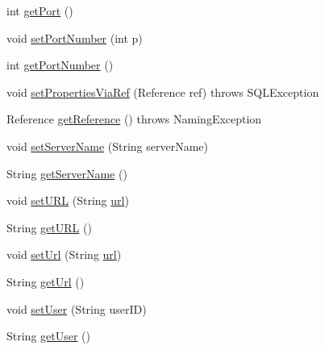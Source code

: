 \begin{DoxyCompactItemize}
\item 
int \mbox{\hyperlink{classcom_1_1mysql_1_1jdbc_1_1jdbc2_1_1optional_1_1_mysql_data_source_a156d5423e0ec869617b665908e932bf6}{get\+Port}} ()
\item 
void \mbox{\hyperlink{classcom_1_1mysql_1_1jdbc_1_1jdbc2_1_1optional_1_1_mysql_data_source_a18cf8b4b24e11ab5df45f4f9dc82d3aa}{set\+Port\+Number}} (int p)
\item 
int \mbox{\hyperlink{classcom_1_1mysql_1_1jdbc_1_1jdbc2_1_1optional_1_1_mysql_data_source_ae5f33a812875972ef3269a3c0681c600}{get\+Port\+Number}} ()
\item 
void \mbox{\hyperlink{classcom_1_1mysql_1_1jdbc_1_1jdbc2_1_1optional_1_1_mysql_data_source_a49e5afebf285cf08c2f2fae76d63aba4}{set\+Properties\+Via\+Ref}} (Reference ref)  throws S\+Q\+L\+Exception 
\item 
Reference \mbox{\hyperlink{classcom_1_1mysql_1_1jdbc_1_1jdbc2_1_1optional_1_1_mysql_data_source_a75a3ebb597b5c7d7ab881e9253470ef8}{get\+Reference}} ()  throws Naming\+Exception 
\item 
void \mbox{\hyperlink{classcom_1_1mysql_1_1jdbc_1_1jdbc2_1_1optional_1_1_mysql_data_source_aa9b7531972e6bf6b0c4488bf41307581}{set\+Server\+Name}} (String server\+Name)
\item 
String \mbox{\hyperlink{classcom_1_1mysql_1_1jdbc_1_1jdbc2_1_1optional_1_1_mysql_data_source_a91c1773084dd32d26ff498f5efac43ef}{get\+Server\+Name}} ()
\item 
void \mbox{\hyperlink{classcom_1_1mysql_1_1jdbc_1_1jdbc2_1_1optional_1_1_mysql_data_source_a44602f5e80027ae517af85b710e5651f}{set\+U\+RL}} (String \mbox{\hyperlink{classcom_1_1mysql_1_1jdbc_1_1jdbc2_1_1optional_1_1_mysql_data_source_a20e8de35ee782ec00f41191aa7ed2101}{url}})
\item 
String \mbox{\hyperlink{classcom_1_1mysql_1_1jdbc_1_1jdbc2_1_1optional_1_1_mysql_data_source_a53c7e30b2c6b71edcd194fd8ecd5ebba}{get\+U\+RL}} ()
\item 
void \mbox{\hyperlink{classcom_1_1mysql_1_1jdbc_1_1jdbc2_1_1optional_1_1_mysql_data_source_abdeb3391c72e2633372294991d9291fb}{set\+Url}} (String \mbox{\hyperlink{classcom_1_1mysql_1_1jdbc_1_1jdbc2_1_1optional_1_1_mysql_data_source_a20e8de35ee782ec00f41191aa7ed2101}{url}})
\item 
String \mbox{\hyperlink{classcom_1_1mysql_1_1jdbc_1_1jdbc2_1_1optional_1_1_mysql_data_source_a5e66ffff5f2e60b902e05cbb12f32a6c}{get\+Url}} ()
\item 
void \mbox{\hyperlink{classcom_1_1mysql_1_1jdbc_1_1jdbc2_1_1optional_1_1_mysql_data_source_ac80d398633ea31db75d7fbbba6f14c20}{set\+User}} (String user\+ID)
\item 
String \mbox{\hyperlink{classcom_1_1mysql_1_1jdbc_1_1jdbc2_1_1optional_1_1_mysql_data_source_a91ebbda8d7cd1ddd53bf681738155854}{get\+User}} ()
\end{DoxyCompactItemize}
